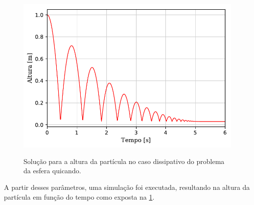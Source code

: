 \begin{figure}[htb!]
	\caption{Solução para a altura da partícula no caso dissipativo do problema da esfera quicando.}
	\centering
		\includegraphics[scale=1]{images/bouncing_sphere/dissipative/y_position.pdf}
	\label{fig:bouncing_sphere_y_position}
	\sourceMe
\end{figure}

A partir desses parâmetros, uma simulação foi executada, resultando na altura da partícula em função do tempo como exposta na \cref{fig:bouncing_sphere_y_position}.


